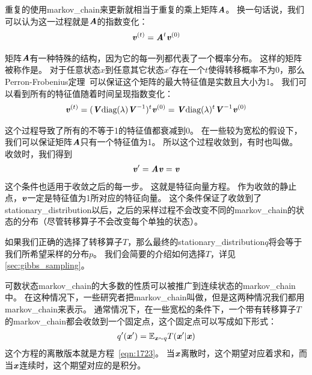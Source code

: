 重复的使用\gls{markov_chain}来更新就相当于重复的乘上矩阵$\boldsymbol{\mathit{A}}$。
换一句话说，我们可以认为这一过程就是$\boldsymbol{\mathit{A}}$的指数变化：
\begin{align}
\boldsymbol{\mathit{v}}^{(t)} = \boldsymbol{\mathit{A}}^{t} \boldsymbol{\mathit{v}}^{(0)}
\end{align}

矩阵$\boldsymbol{\mathit{A}}$有一种特殊的结构，因为它的每一列都代表了一个概率分布。
这样的矩阵被称作是。
对于任意状态$x$到任意其它状态$x'$存在一个$t$使得转移概率不为0，那么Perron-Frobenius定理~\citep{perron1907theorie,frobenius1908matrizen}可以保证这个矩阵的最大特征值是实数且大小为1。
我们可以看到所有的特征值随着时间呈现指数变化：
\begin{align}
\boldsymbol{\mathit{v}}^{(t)} = (\boldsymbol{\mathit{V}} \text{diag}(\lambda)\boldsymbol{\mathit{V}}^{-1})^{t} \boldsymbol{\mathit{v}}^{(0)}
 = \boldsymbol{\mathit{V}} \text{diag}(\lambda)^t \boldsymbol{\mathit{V}}^{-1} \boldsymbol{\mathit{v}}^{(0)}
\end{align}


这个过程导致了所有的不等于1的特征值都衰减到0。
在一些较为宽松的假设下，我们可以保证矩阵$\boldsymbol{\mathit{A}}$只有一个特征值为1。
所以这个过程收敛到，有时也叫做。
收敛时，我们得到
\begin{align}
\label{eqn:1723}
\boldsymbol{\mathit{v}} ' = \boldsymbol{\mathit{A}} \boldsymbol{\mathit{v}} = \boldsymbol{\mathit{v}} 
\end{align}
这个条件也适用于收敛之后的每一步。
这就是特征向量方程。
作为收敛的静止点，$\boldsymbol{\mathit{v}}$一定是特征值为1所对应的特征向量。
这个条件保证了收敛到了\gls{stationary_distribution}以后，之后的采样过程不会改变不同的\gls{markov_chain}的状态的分布（尽管转移算子不会改变每个单独的状态）。

如果我们正确的选择了转移算子$T$，那么最终的\gls{stationary_distribution}$q$将会等于我们所希望采样的分布$p$。
我们会简要的介绍如何选择$T$，详见\ref{sec:gibbs_sampling}。


可数状态\gls{markov_chain}的大多数的性质可以被推广到连续状态的\gls{markov_chain}中。
在这种情况下，一些研究者把\gls{markov_chain}叫做，但是这两种情况我们都用\gls{markov_chain}来表示。
通常情况下，在一些宽松的条件下，一个带有转移算子$T$的\gls{markov_chain}都会收敛到一个固定点，这个固定点可以写成如下形式：
\begin{align}
q' (\boldsymbol{\mathit{x}}') = \mathbb{E}_{\boldsymbol{\mathit{x}}\sim q}T(\boldsymbol{\mathit{x}}'\vert \boldsymbol{\mathit{x}})
\end{align}
这个方程的离散版本就是方程~\eqref{eqn:1723}。	
当$\boldsymbol{\mathit{x}}$离散时，这个期望对应着求和，而当$\boldsymbol{\mathit{x}}$连续时，这个期望对应的是积分。



